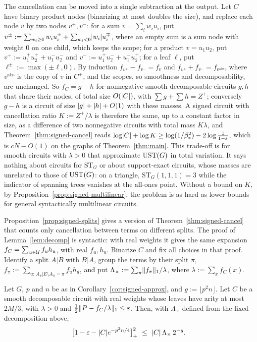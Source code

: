 The cancellation can be moved into a single subtraction at the output. Let $C$ have binary product nodes (binarizing at most doubles the size), and replace each node $v$ by two nodes $v^+,v^-$: for a sum $v=\sum_iw_iu_i$, put $v^\pm:=\sum_{w_i\ge0}w_iu_i^\pm+\sum_{w_i<0}\lvert w_i\rvert u_i^\mp$, where an empty sum is a sum node with weight $0$ on one child, which keeps the scope; for a product $v=u_1u_2$, put $v^+:=u_1^+u_2^++u_1^-u_2^-$ and $v^-:=u_1^+u_2^-+u_1^-u_2^+$; for a leaf $\ell$, put $\ell^\pm:=\max(\pm\ell,0)$. By induction $f_{v^+}-f_{v^-}=f_v$ and $f_{v^+}+f_{v^-}=f_{v^{\mathrm{abs}}}$, where $v^{\mathrm{abs}}$ is the copy of $v$ in $C^+$, and the scopes, so smoothness and decomposability, are unchanged. So $f_C=g-h$ for nonnegative smooth decomposable circuits $g,h$ that share their nodes, of total size $O(\lvert C\rvert)$, with $\sum g+\sum h=Z^+$; conversely $g-h$ is a circuit of size $\lvert g\rvert+\lvert h\rvert+O(1)$ with these masses. A signed circuit with cancellation ratio $K:=Z^+/\lambda$ is therefore the same, up to a constant factor in size, as a difference of two nonnegative circuits with total mass $K\lambda$, and Theorem~\ref{thm:signed-cancel} reads $\log\lvert C\rvert+\log K\ge\log(1/\beta_*^2)-2\log\frac1{1-\varepsilon}$, which is $cN-O(1)$ on the graphs of Theorem~\ref{thm:main}. This trade-off is for smooth circuits with $\lambda>0$ that approximate $\mathrm{UST}(G)$ in total variation. It says nothing about circuits for $\mathrm{ST}_G$ or about support-exact circuits, whose masses are unrelated to those of $\mathrm{UST}(G)$: on a triangle, $\mathrm{ST}_G(1,1,1)=3$ while the indicator of spanning trees vanishes at the all-ones point. Without a bound on $K$, by Proposition~\ref{prop:signed-multilinear}, the problem is as hard as lower bounds for general syntactically multilinear circuits.

Proposition~\ref{prop:signed-splits} gives a version of Theorem~\ref{thm:signed-cancel} that counts only cancellation between terms on different splits. The proof of Lemma~\ref{lem:decomp} is syntactic: with real weights it gives the same expansion $f_C=\sum_{u\in\mathcal{U}}f_uh_u$, with real $f_u,h_u$. Binarize $C$ and fix all choices in that proof. Identify a split $A|B$ with $B|A$, group the terms by their split $\pi$, $f_\pi:=\sum_{u:\,A_u|E\setminus A_u=\pi}f_uh_u$, and put $\Lambda_\times:=\sum_\pi\lVert f_\pi\rVert_1/\lambda$, where $\lambda:=\sum_xf_C(x)$.

\begin{proposition}\label{prop:signed-cross}
Let $G$, $p$ and $n$ be as in Corollary~\ref{cor:signed-approx}, and $g:=\lfloor p^2n\rfloor$. Let $C$ be a smooth decomposable circuit with real weights whose leaves have arity at most $2M/3$, with $\lambda>0$ and $\frac12\lVert P-f_C/\lambda\rVert_1\le\varepsilon$. Then, with $\Lambda_\times$ defined from the fixed decomposition above,
\[
  \bigl[1-\eps-\abs Ce^{-p^2n/4}\bigr]_+^2\ \le\ \abs C\,\Lambda_\times\,2^{-g} .
\]
\end{proposition}

